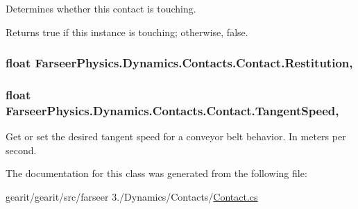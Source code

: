 Determines whether this contact is touching. 

\begin{DoxyReturn}{Returns}
{\ttfamily true} if this instance is touching; otherwise, {\ttfamily false}. 
\end{DoxyReturn}
\hypertarget{class_farseer_physics_1_1_dynamics_1_1_contacts_1_1_contact_a3028c01a113024dda14c9143b449883a}{
\subsubsection[{Restitution}]{\setlength{\rightskip}{0pt plus 5cm}float Farseer\+Physics.\+Dynamics.\+Contacts.\+Contact.\+Restitution\hspace{0.3cm}{\ttfamily [get]}, {\ttfamily [set]}}}\label{class_farseer_physics_1_1_dynamics_1_1_contacts_1_1_contact_a3028c01a113024dda14c9143b449883a}
\hypertarget{class_farseer_physics_1_1_dynamics_1_1_contacts_1_1_contact_a36370ced1defd0156ca5cf00b1b2683f}{
\subsubsection[{Tangent\+Speed}]{\setlength{\rightskip}{0pt plus 5cm}float Farseer\+Physics.\+Dynamics.\+Contacts.\+Contact.\+Tangent\+Speed\hspace{0.3cm}{\ttfamily [get]}, {\ttfamily [set]}}}\label{class_farseer_physics_1_1_dynamics_1_1_contacts_1_1_contact_a36370ced1defd0156ca5cf00b1b2683f}


Get or set the desired tangent speed for a conveyor belt behavior. In meters per second. 



The documentation for this class was generated from the following file\+:\begin{DoxyCompactItemize}
\item 
gearit/gearit/src/farseer 3./\+Dynamics/\+Contacts/\hyperlink{_contact_8cs}{Contact.\+cs}\end{DoxyCompactItemize}
